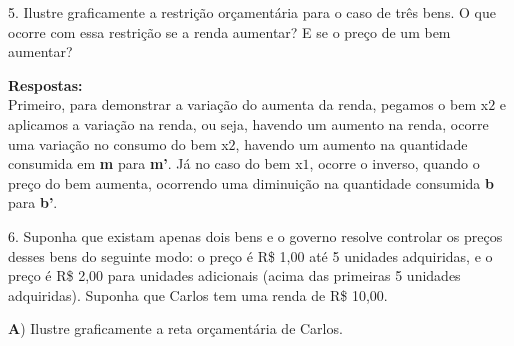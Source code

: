 \documentclass[a4paper, 12pt]{article} %
\begin{document}
\begin{flushleft}
5. Ilustre graficamente a restrição orçamentária para o caso de três bens. O que ocorre com essa restrição se a renda aumentar? E se o preço de um bem aumentar? \singlespacing

\textbf{Respostas:} 
\\
Primeiro, para demonstrar a variação do aumenta da renda, pegamos o bem x$\textit{2}$ e aplicamos a variação na renda, ou seja, havendo um aumento na renda, ocorre uma variação no consumo do bem x$\textit{2}$, havendo um aumento na quantidade consumida em \textbf{m} para \textbf{m'}. Já no caso do bem x$\textit{1}$, ocorre o inverso, quando o preço do bem aumenta, ocorrendo uma diminuição na quantidade consumida \textbf{b} para \textbf{b'}.

\begin{center}

\end{center}

6. Suponha que existam apenas dois bens e o governo resolve controlar os preços desses bens do seguinte modo: o preço é R\$ 1,00 até 5 unidades adquiridas, e o preço é R\$ 2,00 para unidades adicionais (acima das primeiras 5 unidades adquiridas). Suponha que Carlos tem uma renda de R\$ 10,00. \singlespacing

\textbf{A}) Ilustre graficamente a reta orçamentária de Carlos.


\end{flushleft}
\end{document}
